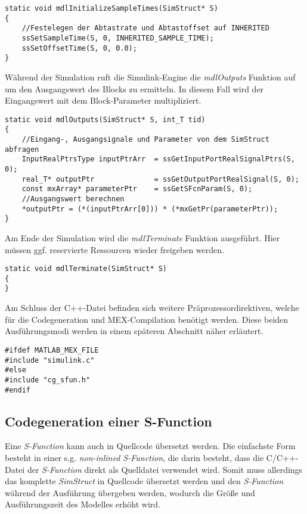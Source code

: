 \begin{lstlisting}
static void mdlInitializeSampleTimes(SimStruct* S)
{
    //Festelegen der Abtastrate und Abtastoffset auf INHERITED
    ssSetSampleTime(S, 0, INHERITED_SAMPLE_TIME);
    ssSetOffsetTime(S, 0, 0.0);
}
\end{lstlisting}

Während der Simulation ruft die Simulink-Engine die \textit{mdlOutputs} Funktion auf um den Ausgangswert des Blocks zu ermitteln. In diesem Fall wird der Eingangswert mit dem Block-Parameter multipliziert.

\begin{lstlisting}
static void mdlOutputs(SimStruct* S, int_T tid)
{   
    //Eingang-, Ausgangsignale und Parameter von dem SimStruct abfragen
    InputRealPtrsType inputPtrArr  = ssGetInputPortRealSignalPtrs(S, 0);
    real_T* outputPtr              = ssGetOutputPortRealSignal(S, 0);
    const mxArray* parameterPtr    = ssGetSFcnParam(S, 0);
    //Ausgangswert berechnen
    *outputPtr = (*(inputPtrArr[0])) * (*mxGetPr(parameterPtr));
}
\end{lstlisting}

Am Ende der Simulation wird die \textit{mdlTerminate} Funktion ausgeführt. Hier müssen ggf. reservierte Ressourcen wieder freigeben werden.

\begin{lstlisting}
static void mdlTerminate(SimStruct* S)
{
}
\end{lstlisting}

Am Schluss der C++-Datei befinden sich weitere Präprozessordirektiven, welche für die Codegeneration und MEX-Compilation benötigt werden. Diese beiden Ausführungsmodi werden in einem späteren Abschnitt näher erläutert.

\begin{lstlisting}
#ifdef MATLAB_MEX_FILE
#include "simulink.c"
#else
#include "cg_sfun.h"
#endif
\end{lstlisting}

\subsection{Codegeneration einer S-Function}
Eine \textit{S-Function} kann auch in Quellcode übersetzt werden. Die einfachste Form besteht in einer s.g. \textit{non-inlined S-Function}, die darin besteht, dass die C/C++-Datei der \textit{S-Function} direkt als Quelldatei verwendet wird. Somit muss allerdings das komplette \textit{SimStruct} in Quellcode übersetzt werden und den \textit{S-Function} während der Ausführung übergeben werden, wodurch die Größe und Ausführungszeit des Modelles erhöht wird. 

